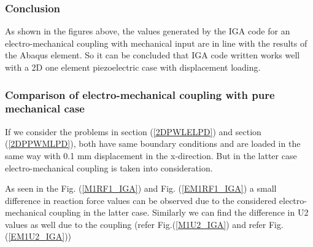 \documentclass[11pt]{article}
\begin{document}
\subsubsection{Conclusion}
As shown in the figures above, the values generated by the IGA code for an electro-mechanical coupling with mechanical input are in line with the results of the Abaqus element. So it can be concluded that IGA code written works well with a 2D one element piezoelectric case with displacement loading.

\subsubsection{Comparison of electro-mechanical coupling with pure mechanical case}
If we consider the problems in section (\ref{2DPWLELPD}) and section (\ref{2DPPWMLPD}), both have same boundary conditions and are loaded in the same way with 0.1 mm displacement in the x-direction. But in the latter case electro-mechanical coupling is taken into consideration.

As seen in the Fig. (\ref{M1RF1_IGA}) and Fig. (\ref{EM1RF1_IGA}) a small difference in reaction force values can be observed due to the considered electro-mechanical coupling in the latter case. Similarly we can find the difference in U2 values as well due to the coupling (refer Fig.(\ref{M1U2_IGA}) and refer Fig. (\ref{EM1U2_IGA}))
\end{document}
